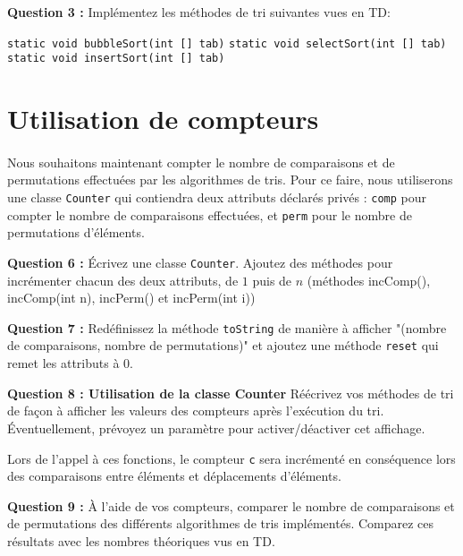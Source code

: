 \documentclass[iutinfo,a4paper,10pt]{ustl-tdtp}
\begin{document}
\textbf{Question 3 :}\newline
Implémentez les méthodes de tri suivantes vues en TD: 

 \texttt{static void bubbleSort(int [] tab)}\newline
 \texttt{static void selectSort(int [] tab)}\newline
 \texttt{static void insertSort(int [] tab)}



\section{Utilisation de compteurs}
\paragraph{}
Nous souhaitons maintenant compter le nombre de comparaisons et de permutations effectuées par les algorithmes de tris. Pour ce faire, nous utiliserons une classe \texttt{Counter} qui contiendra deux attributs déclarés privés : \texttt{comp} pour compter le nombre de comparaisons effectuées, et \texttt{perm} pour le nombre de permutations d'éléments.\newline


\textbf{Question 6 : }\newline
Écrivez une classe \texttt{Counter}. Ajoutez des méthodes pour incrémenter chacun des deux attributs, de $1$ puis de $n$ (méthodes incComp(), incComp(int
n), incPerm() et incPerm(int i))\newline


\textbf{Question 7 : } \newline
Redéfinissez la méthode \texttt{toString} de manière à afficher "(nombre de comparaisons, nombre de permutations)" et ajoutez une méthode \texttt{reset} qui remet les attributs à 0.\newline


\textbf{Question 8 : Utilisation de la classe Counter}\newline
Réécrivez vos méthodes de tri de façon à afficher les valeurs des compteurs après l'exécution du tri. Éventuellement, prévoyez un paramètre pour activer/déactiver cet affichage.

Lors de l'appel à ces fonctions, le compteur \texttt{c} sera incrémenté en conséquence lors des comparaisons entre éléments et
déplacements d'éléments.\newline


\textbf{Question 9 : } \newline
À l'aide de vos compteurs, comparer le nombre de comparaisons et de permutations des différents algorithmes de tris implémentés. Comparez ces résultats avec les nombres théoriques vus en TD.
\end{document}
